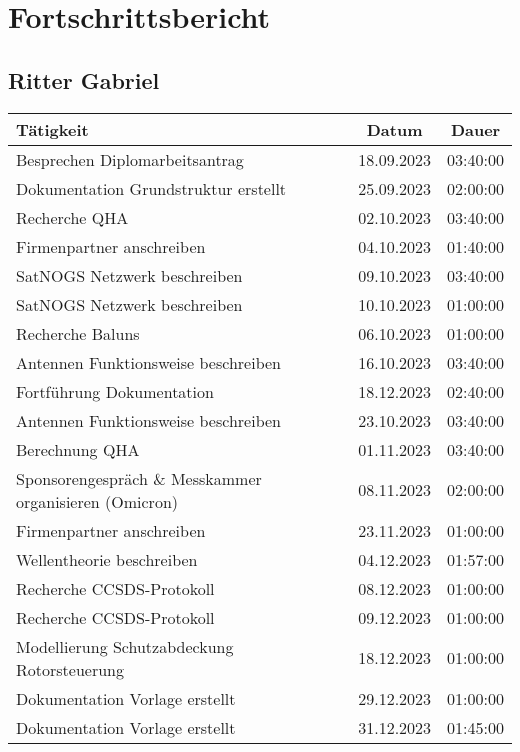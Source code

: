 \chapter{Fortschrittsbericht}

\section{Ritter Gabriel}

\begin{longtable}{|l|c|c|}
	\hline
	\textbf{Tätigkeit} & \textbf{Datum} & \textbf{Dauer} \\
	\hline
	Besprechen Diplomarbeitsantrag & 18.09.2023 & 03:40:00 \\
	\hline
	Dokumentation Grundstruktur erstellt & 25.09.2023 & 02:00:00 \\
	\hline
	Recherche QHA & 02.10.2023 & 03:40:00 \\
	\hline
	Firmenpartner anschreiben & 04.10.2023 & 01:40:00 \\
	\hline
	SatNOGS Netzwerk beschreiben & 09.10.2023 & 03:40:00 \\
	\hline
	SatNOGS Netzwerk beschreiben & 10.10.2023 & 01:00:00 \\
	\hline
	Recherche Baluns & 06.10.2023 & 01:00:00 \\
	\hline
	Antennen Funktionsweise beschreiben & 16.10.2023 & 03:40:00 \\
	\hline
	Fortführung Dokumentation & 18.12.2023 & 02:40:00 \\
	\hline
	Antennen Funktionsweise beschreiben & 23.10.2023 & 03:40:00 \\
	\hline
	Berechnung QHA & 01.11.2023 & 03:40:00 \\
	\hline
	Sponsorengespräch \& Messkammer organisieren (Omicron) & 08.11.2023 & 02:00:00 \\
	\hline
	Firmenpartner anschreiben & 23.11.2023 & 01:00:00 \\
	\hline
	Wellentheorie beschreiben & 04.12.2023 & 01:57:00 \\
	\hline
	Recherche CCSDS-Protokoll & 08.12.2023 & 01:00:00 \\
	\hline
	Recherche CCSDS-Protokoll & 09.12.2023 & 01:00:00 \\
	\hline
	Modellierung Schutzabdeckung Rotorsteuerung & 18.12.2023 & 01:00:00 \\
	\hline
	Dokumentation Vorlage erstellt & 29.12.2023 & 01:00:00 \\
	\hline
	Dokumentation Vorlage erstellt & 31.12.2023 & 01:45:00 \\

\end{longtable}
